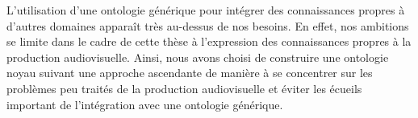 L'utilisation d'une ontologie générique pour intégrer des connaissances propres à d'autres domaines apparaît très au-dessus de nos besoins. 
En effet, nos ambitions se limite dans le cadre de cette thèse à l'expression des connaissances propres à la production audiovisuelle.
Ainsi, nous avons choisi de construire une ontologie noyau suivant une approche ascendante de manière à se concentrer sur les problèmes peu traités de la production audiovisuelle et éviter les écueils important de l'intégration avec une ontologie générique.







